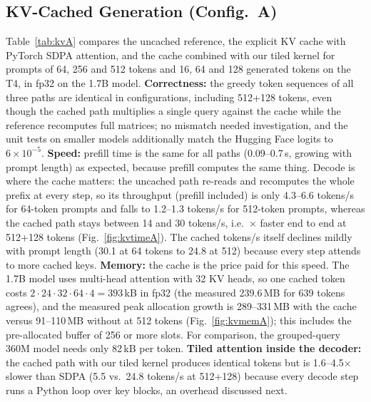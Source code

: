 \subsection{KV-Cached Generation (Config.~A)}
\label{sec:kvres}
Table~\ref{tab:kvA} compares the uncached reference, the explicit KV cache with PyTorch SDPA attention, and the cache combined with our tiled kernel for prompts of 64, 256 and 512 tokens and 16, 64 and 128 generated tokens on the T4, in fp32 on the 1.7B model. \textbf{Correctness:} the greedy token sequences of all three paths are identical in \GKVAllMatch{} configurations, including 512+128 tokens, even though the cached path multiplies a single query against the cache while the reference recomputes full matrices; no mismatch needed investigation, and the unit tests on smaller models additionally match the Hugging Face logits to $6\times10^{-5}$. \textbf{Speed:} prefill time is the same for all paths (0.09--0.7\,s, growing with prompt length) as expected, because prefill computes the same thing. Decode is where the cache matters: the uncached path re-reads and recomputes the whole prefix at every step, so its throughput (prefill included) is only 4.3--6.6 tokens/s for 64-token prompts and falls to 1.2--1.3 tokens/s for 512-token prompts, whereas the cached path stays between 14 and 30 tokens/s, i.e.\ \GKVSpeedup$\times$ faster end to end at 512+128 tokens (Fig.~\ref{fig:kvtimeA}). The cached tokens/s itself declines mildly with prompt length (30.1 at 64 tokens to 24.8 at 512) because every step attends to more cached keys. \textbf{Memory:} the cache is the price paid for this speed. The 1.7B model uses multi-head attention with 32 KV heads, so one cached token costs $2\cdot24\cdot32\cdot64\cdot4=393$\,kB in fp32 (the measured 239.6\,MB for 639 tokens agrees), and the measured peak allocation growth is 289--331\,MB with the cache versus 91--110\,MB without at 512 tokens (Fig.~\ref{fig:kvmemA}); this includes the pre-allocated buffer of 256 or more slots. For comparison, the grouped-query 360M model needs only 82\,kB per token. \textbf{Tiled attention inside the decoder:} the cached path with our tiled kernel produces identical tokens but is 1.6--4.5$\times$ slower than SDPA (5.5 vs.\ 24.8 tokens/s at 512+128) because every decode step runs a Python loop over key blocks, an overhead discussed next.

